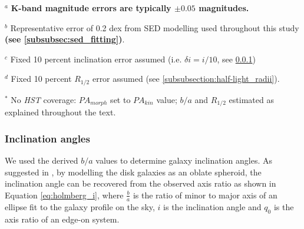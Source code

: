 \documentclass[fleqn,usenatbib]{mnras}
\begin{document}
\begin{table*}
\begin{threeparttable}
\begin{tablenotes}
      \small
      \item $^{a}$ \textbf{K-band magnitude errors are typically $\pm0.05$ magnitudes.}
      \item $^{b}$ Representative error of 0.2 dex from SED modelling used throughout this study \textbf{(see \cref{subsubsec:sed_fitting})}.
      \item $^{c}$ Fixed 10 percent inclination error assumed (i.e. $\delta i = i / 10$, see \protect\cref{subsubsection:inclination_angle})
      \item $^{d}$ Fixed 10 percent $R_{1/2}$ error assumed (see \protect\cref{subsubsection:half-light_radii}).
      \item $^{*}$ No {\em HST} coverage: $PA_{morph}$ set to $PA_{kin}$ value; $b/a$ and $R_{1/2}$ estimated as explained throughout the text.
    \end{tablenotes}
  \end{threeparttable}
  \end{table*}


\subsubsection{Inclination angles}\label{subsubsection:inclination_angle}
We used the derived $b/a$ values to determine galaxy inclination angles.
As suggested in \cite{Holmberg1958}, by modelling the disk galaxies as an oblate spheroid, the inclination angle can be recovered from the observed axis ratio as shown in Equation \ref{eq:holmberg_i}, where $\frac{b}{a}$ is the ratio of minor to major axis of an ellipse fit to the galaxy profile on the sky, $i$ is the inclination angle and $q_{0}$ is the axis ratio of an edge-on system.
\end{document}
